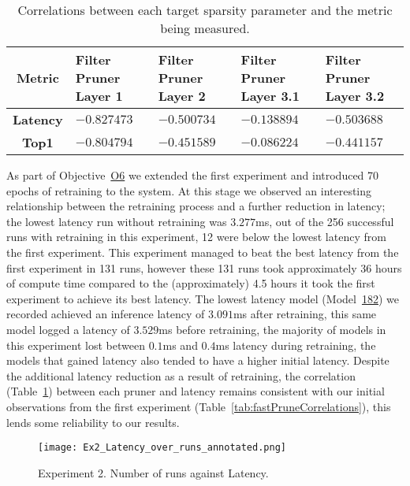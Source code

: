 \documentclass[../Dissertation.tex]{subfiles}
\begin{document}
\singlespacing
\begin{table}[H]
    \centering
    \begin{tabular}{@{}cp{26mm}p{26mm}p{26mm}p{26mm}@{}}
    \toprule
    \textbf{Metric}  & \textbf{Filter Pruner  Layer 1} & \textbf{Filter Pruner Layer 2} & \textbf{Filter Pruner Layer 3.1} & \textbf{Filter Pruner Layer 3.2} \\ \midrule
    \textbf{Latency} & $-0.827473$                        & $-0.500734$                      & $-0.138894$                         & $-0.503688$                         \\
    \textbf{Top1}    & $-0.804794$                        & $-0.451589$                      & $-0.086224$                        & $-0.441157$                        \\ \bottomrule
    \end{tabular}
    \caption{Correlations between each target sparsity parameter and the metric being measured.}
    \label{tab:Ex2PruneCorrelations}
\end{table}
\doublespacing

As part of Objective~\hyperref[obj:AutoParams]{O6} we extended the first experiment and introduced 70 epochs of retraining to the system. 
At this stage we observed an interesting relationship between the retraining process and a further reduction in latency; the lowest latency run without retraining was $3.277$ms, out of the 256 successful runs with retraining in this experiment, 12 were below the lowest latency from the first experiment.
This experiment managed to beat the best latency from the first experiment in 131 runs, however these 131 runs took approximately 36 hours of compute time compared to the (approximately) 4.5 hours it took the first experiment to achieve its best latency.
The lowest latency model (Model~\hyperref[sec:sec:unique-sweep-182]{182}) we recorded achieved an inference latency of $3.091$ms after retraining, this same model logged a latency of $3.529$ms before retraining, the majority of models in this experiment lost between $0.1$ms and $0.4$ms latency during retraining, the models that gained latency also tended to have a higher initial latency.
Despite the additional latency reduction as a result of retraining, the correlation (Table~\ref{tab:Ex2PruneCorrelations}) between each pruner and latency remains consistent with our initial observations from the first experiment (Table~\ref{tab:fastPruneCorrelations}), this lends some reliability to our results.


\begin{figure}[H]
    \centering
    \texttt{[image: Ex2\_Latency\_over\_runs\_annotated.png]}
    \caption{Experiment 2. Number of runs against Latency.}
\end{figure}
\end{document}
